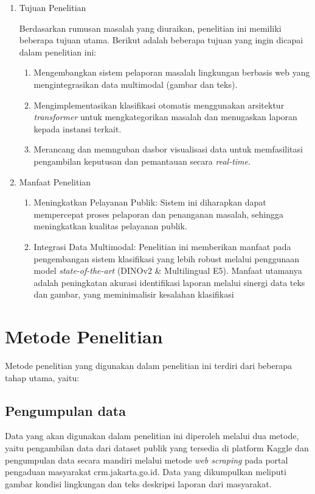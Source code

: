  \begin{enumerate}
    \item Tujuan Penelitian 
    
    Berdasarkan rumusan masalah yang diuraikan, penelitian ini memiliki beberapa tujuan utama. Berikut adalah beberapa tujuan yang ingin dicapai dalam penelitian ini: 
        \begin{enumerate}
            \item Mengembangkan sistem pelaporan masalah lingkungan berbasis web yang mengintegrasikan data multimodal (gambar dan teks). 
            \item Mengimplementasikan klasifikasi otomatis menggunakan arsitektur \textit {transformer} untuk mengkategorikan masalah dan menugaskan laporan kepada instansi terkait.
            \item Merancang dan memnguban dasbor visualisasi data untuk memfasilitasi pengambilan keputusan dan pemantauan secara \textit{real-time}.  
        \end{enumerate}

    \item Manfaat Penelitian
    \begin{enumerate}
        \item Meningkatkan Pelayanan Publik: Sistem ini diharapkan dapat mempercepat proses pelaporan dan penanganan masalah, sehingga meningkatkan kualitas pelayanan publik.
        \item Integrasi Data Multimodal: Penelitian ini memberikan manfaat pada pengembangan sistem klasifikasi yang lebih robust melalui penggunaan model \textit{state-of-the-art} (DINOv2 \& Multilingual E5). Manfaat utamanya adalah peningkatan akurasi identifikasi laporan melalui sinergi data teks dan gambar, yang meminimalisir kesalahan klasifikasi
    \end{enumerate}

 \end{enumerate}

 \section{Metode Penelitian}
    Metode penelitian yang digunakan dalam penelitian ini terdiri dari beberapa tahap utama, yaitu:
    
    \subsection{Pengumpulan data}
     Data yang akan digunakan dalam penelitian ini diperoleh melalui dua metode, yaitu pengambilan data dari dataset publik yang tersedia di platform Kaggle dan pengumpulan data secara mandiri melalui metode \textit{web scraping} pada portal pengaduan masyarakat crm.jakarta.go.id. Data yang dikumpulkan meliputi gambar kondisi lingkungan dan teks deskripsi laporan dari masyarakat.
